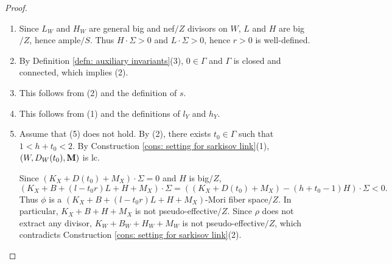 \documentclass[11pt]{amsart}
\numberwithin{equation}{section}
\newcommand{\Mm}{{\bf{M}}}
\newcommand{\Ii}{\Gamma}
\theoremstyle{definition}
\theoremstyle{definition}
\theoremstyle{definition}
\begin{document}
\begin{proof}
 \begin{enumerate}
   \item Since $L_W$ and $H_W$ are general big and nef$/Z$ divisors on $W$, $L$ and $H$ are big$/Z$, hence ample$/S$. Thus $H\cdot\Sigma>0$ and $L\cdot\Sigma>0$, hence $r>0$ is well-defined.
   \item By Definition \ref{defn: auxiliary invariants}(3), $0\in\Ii$ and $\Ii$ is closed and connected, which implies (2).
   \item This follows from (2) and the definition of $s$.
   \item This  follows from (1) and the definitions of $l_Y$ and $h_Y$.

   \item Assume that (5) does not hold. By (2), there exists $t_0\in\Ii$ such that $1<h+t_0<2$. By Construction \ref{cons: setting for sarkisov link}(1), $(W,D_W(t_0),\Mm)$ is lc.

Since $(K_X+D(t_0)+M_X)\cdot\Sigma=0$ and $H$ is big$/Z$, 
$$(K_X+B+(l-t_0r)L+H+M_X)\cdot\Sigma=((K_X+D(t_0)+M_X)-(h+t_0-1)H)\cdot\Sigma<0.$$
Thus $\phi$ is a $(K_X+B+(l-t_0r)L+H+M_X)$-Mori fiber space$/Z$. In particular, $K_X+B+H+M_X$ is not pseudo-effective$/Z$. Since $\rho$ does not extract any divisor, $K_W+B_W+H_W+M_W$ is not pseudo-effective$/Z$, which contradicts Construction \ref{cons: setting for sarkisov link}(2).
 \end{enumerate} 
\end{proof}
\end{document}
